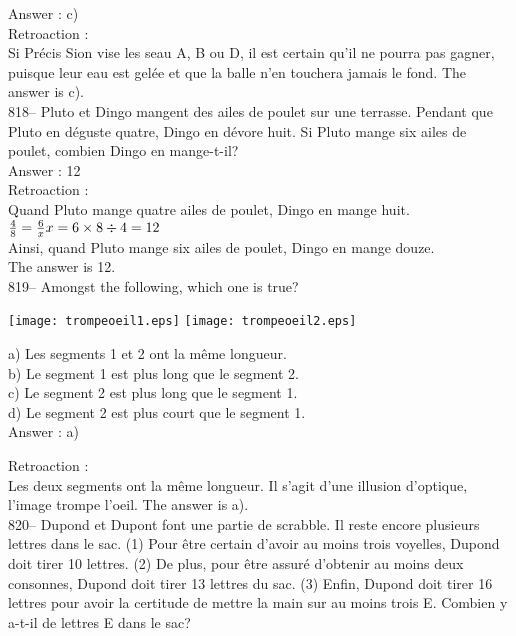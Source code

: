 ﻿\documentclass[letterpaper, 12pt]{article}
\begin{document}
Answer : c)\\

Retroaction : \\
Si Pr\'ecis Sion vise les seau A, B ou D, il est certain qu'il ne pourra pas
gagner, puisque leur eau est gel\'ee et que la balle n'en touchera jamais le
fond.  The answer is c).\\

818-- Pluto et Dingo mangent des ailes de poulet sur une terrasse.  Pendant
que Pluto en d\'eguste quatre, Dingo en d\'evore huit.  Si Pluto mange six
ailes de poulet, combien Dingo en mange-t-il?\\

Answer : 12\\

Retroaction : \\
Quand Pluto mange quatre ailes de poulet, Dingo en mange huit.\\[2mm]
$\frac{4}{8}=\frac{6}{x}\\[2mm]
x=6\times8\div4=12$\\[2mm]
Ainsi, quand Pluto mange six ailes de poulet, Dingo en mange douze.\\[2mm]
The answer is 12.\\





819-- Amongst the following, which one is true?\\
    \begin{center}
    \texttt{[image: trompeoeil1.eps]}
\texttt{[image: trompeoeil2.eps]}
    \end{center}
a) Les segments 1 et 2 ont la m\^eme longueur.\\
b) Le segment 1 est plus long que le segment 2.\\
c) Le segment 2 est plus long que le segment 1.\\
d) Le segment 2 est plus court que le segment 1.\\

Answer : a)

Retroaction : \\
Les deux segments ont la m\^eme longueur.  Il s'agit d'une illusion
d'optique, l'image trompe l'oeil.  The answer is a).\\

820-- Dupond et Dupont font une partie de scrabble.  Il reste encore
plusieurs lettres dans le sac.  (1) Pour \^etre certain d'avoir au moins
trois voyelles, Dupond doit tirer 10 lettres.  (2) De plus, pour \^etre
assur\'e d'obtenir au moins deux consonnes, Dupond doit tirer 13 lettres du
sac.  (3) Enfin, Dupond doit tirer 16 lettres pour avoir la certitude de
mettre la main sur au moins trois E. Combien y a-t-il de lettres E dans le
sac?\\
\end{document}
